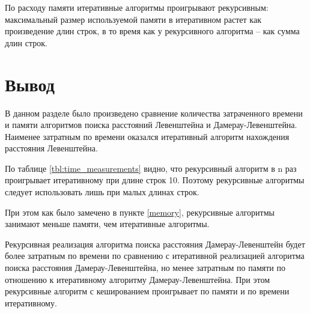 По расходу памяти итеративные алгоритмы проигрывают рекурсивным: максимальный размер используемой памяти в итеративном растет
как произведение длин строк, в то время как у рекурсивного алгоритма --
как сумма длин строк.


\section*{Вывод}

В данном разделе было произведено сравнение количества затраченного времени и памяти алгоритмов поиска расстояний Левенштейна и
Дамерау-Левенштейна. Наименее затратным по времени оказался итеративный алгоритм нахождения расстояния Левенштейна.

По таблице \ref{tbl:time_measurements} видно, что рекурсивный алгоритм в n раз проигрывает итеративному при длине строк 10. Поэтому рекурсивные алгоритмы следует использовать лишь при малых длинах строк.

При этом как было замечено в пункте \ref{memory}, рекурсивные алгоритмы занимают меньше памяти, чем итеративные алгоритмы.

Рекурсивная реализация алгоритма поиска расстояния Дамерау-Левенштейн будет более затратным по времени по сравнению с итеративной реализацией алгоритма поиска расстояния Дамерау-Левенштейна, но менее затратным по памяти по отношению к итеративному алгоритму Дамерау-Левенштейна. При этом рекурсивные алгоритм с кешированием проигрывает по памяти и по времени итеративному.